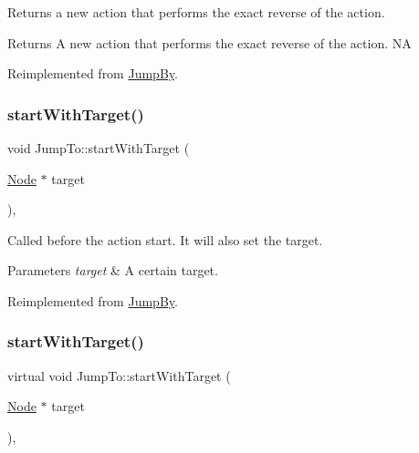 Returns a new action that performs the exact reverse of the action.

\begin{DoxyReturn}{Returns}
A new action that performs the exact reverse of the action.  NA 
\end{DoxyReturn}


Reimplemented from \hyperlink{classJumpBy_a009830002b7a51e9e630baa0b227d279}{Jump\+By}.

\mbox{\label{classJumpTo_abb2372358d593932355300cb89a79f96}} 
\subsubsection{\texorpdfstring{start\+With\+Target()}{startWithTarget()}\hspace{0.1cm}{\footnotesize\ttfamily [1/2]}}
{\footnotesize\ttfamily void Jump\+To\+::start\+With\+Target (\begin{DoxyParamCaption}\item[{\hyperlink{classNode}{Node} $\ast$}]{target }\end{DoxyParamCaption})\hspace{0.3cm}{\ttfamily [override]}, {\ttfamily [virtual]}}

Called before the action start. It will also set the target.


\begin{DoxyParams}{Parameters}
{\em target} & A certain target. \\
\hline
\end{DoxyParams}


Reimplemented from \hyperlink{classJumpBy_a3b05635b8834c6269b249dc1247854e9}{Jump\+By}.

\mbox{\label{classJumpTo_a64047a3cb37ccad99f74e6d1ee9dc271}} 
\subsubsection{\texorpdfstring{start\+With\+Target()}{startWithTarget()}\hspace{0.1cm}{\footnotesize\ttfamily [2/2]}}
{\footnotesize\ttfamily virtual void Jump\+To\+::start\+With\+Target (\begin{DoxyParamCaption}\item[{\hyperlink{classNode}{Node} $\ast$}]{target }\end{DoxyParamCaption})\hspace{0.3cm}{\ttfamily [override]}, {\ttfamily [virtual]}}

